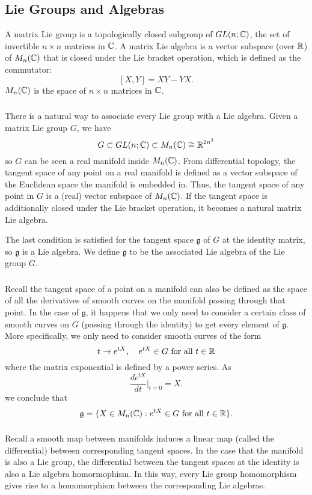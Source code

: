 \subsection{Lie Groups and Algebras}
A matrix Lie group is a topologically closed subgroup of $GL(n; {\mathbb C})$, the set of invertible $n \times n$ matrices in ${\mathbb C}$. A matrix Lie algebra is a vector subspace (over ${\mathbb R}$) of $M_n({\mathbb C})$ that is closed under the Lie bracket operation, which is defined as the commutator:
\[
    [X, Y] = XY - YX.
\]
$M_n({\mathbb C})$ is the space of $n \times n$ matrices in ${\mathbb C}$.

\subsubsection{}
There is a natural way to associate every Lie group with a Lie algebra. Given a matrix Lie group $G$, we have
\[
    G \subset GL(n; {\mathbb C}) \subset M_n({\mathbb C}) \cong {\mathbb R}^{2n^2}
\]
so $G$ can be seen a real manifold inside $M_n({\mathbb C})$. From differential topology, the tangent space of any point on a real manifold is defined as a vector subspace of the Euclidean space the manifold is embedded in. Thus, the tangent space of any point in $G$ is a (real) vector subspace of $M_n({\mathbb C})$. If the tangent space is additionally closed under the Lie bracket operation, it becomes a natural matrix Lie algebra.

The last condition is satisfied for the tangent space $\mathfrak g$ of $G$ at the identity matrix, so $\mathfrak g$ is a Lie algebra. We define $\mathfrak g$ to be the associated Lie algebra of the Lie group $G$.

\subsubsection{}
Recall the tangent space of a point on a manifold can also be defined as the space of all the derivatives of smooth curves on the manifold passing through that point. In the case of $\mathfrak g$, it happens that we only need to consider a certain class of smooth curves on $G$ (passing through the identity) to get every element of $\mathfrak g$. More specifically, we only need to consider smooth curves of the form
\[
    t \rightarrow e^{tX}, \quad e^{tX} \in G \text{ for all } t \in {\mathbb R}
\]
where the matrix exponential is defined by a power series. As
\[
    \frac{d e^{tX}}{dt} \Bigr|_{t = 0} = X.
\]
we conclude that
\[
    \mathfrak g = \{X \in M_n({\mathbb C}) : e^{tX} \in G \text{ for all } t \in {\mathbb R}\}.
\]

\subsubsection{}
Recall a smooth map between manifolds induces a linear map (called the differential) between corresponding tangent spaces. In the case that the manifold is also a Lie group, the differential between the tangent spaces at the identity is also a Lie algebra homormophism. In this way, every Lie group homomorphism gives rise to a homomorphism between the corresponding Lie algebras.
